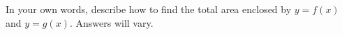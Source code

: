 {In your own words, describe how to find the total area enclosed by $y=f(x)$ and $y=g(x)$.}
{Answers will vary.}
